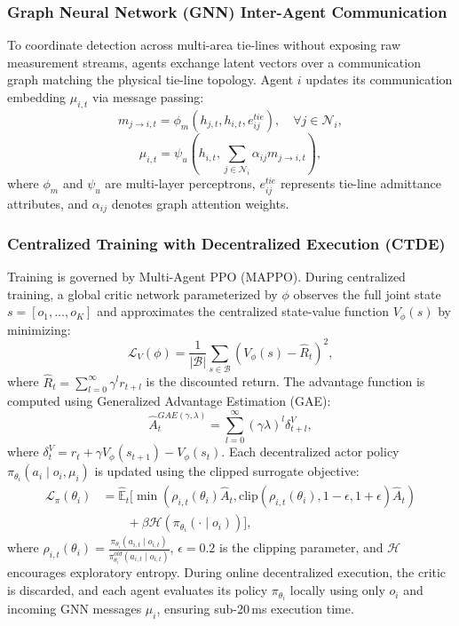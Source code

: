 \documentclass[journal,compsoc]{IEEEtran}
\begin{document}
\subsubsection{Graph Neural Network (GNN) Inter-Agent Communication}
To coordinate detection across multi-area tie-lines without exposing raw measurement streams, agents exchange latent vectors over a communication graph matching the physical tie-line topology. Agent $i$ updates its communication embedding $\mu_{i,t}$ via message passing:
\begin{equation}
    m_{j \to i, t} = \phi_m(h_{j,t}, h_{i,t}, e_{ij}^{tie}), \quad \forall j \in \mathcal{N}_i,
\end{equation}
\begin{equation}
    \mu_{i,t} = \psi_u\left( h_{i,t}, \sum_{j \in \mathcal{N}_i} \alpha_{ij} m_{j \to i, t} \right),
\end{equation}
where $\phi_m$ and $\psi_u$ are multi-layer perceptrons, $e_{ij}^{tie}$ represents tie-line admittance attributes, and $\alpha_{ij}$ denotes graph attention weights.

\subsubsection{Centralized Training with Decentralized Execution (CTDE)}
Training is governed by Multi-Agent PPO (MAPPO). During centralized training, a global critic network parameterized by $\phi$ observes the full joint state $s = [o_1, \dots, o_K]$ and approximates the centralized state-value function $V_\phi(s)$ by minimizing:
\begin{equation}
    \mathcal{L}_V(\phi) = \frac{1}{|\mathcal{B}|} \sum_{s \in \mathcal{B}} \left( V_\phi(s) - \hat{R}_t \right)^2,
\end{equation}
where $\hat{R}_t = \sum_{l=0}^\infty \gamma^l r_{t+l}$ is the discounted return. The advantage function is computed using Generalized Advantage Estimation (GAE):
\begin{equation}
    \hat{A}_t^{GAE(\gamma, \lambda)} = \sum_{l=0}^\infty (\gamma \lambda)^l \delta_{t+l}^V,
\end{equation}
where $\delta_t^V = r_t + \gamma V_\phi(s_{t+1}) - V_\phi(s_t)$. Each decentralized actor policy $\pi_{\theta_i}(a_i \mid o_i, \mu_i)$ is updated using the clipped surrogate objective:
\begin{align}
    \mathcal{L}_\pi(\theta_i) &= \hat{\mathbb{E}}_t \Bigg[ \min \left( \rho_{i,t}(\theta_i) \hat{A}_t, \text{clip}(\rho_{i,t}(\theta_i), 1-\epsilon, 1+\epsilon) \hat{A}_t \right) \nonumber \\
    &\quad\quad + \beta \mathcal{H}(\pi_{\theta_i}(\cdot \mid o_i)) \Bigg],
\end{align}
where $\rho_{i,t}(\theta_i) = \frac{\pi_{\theta_i}(a_{i,t} \mid o_{i,t})}{\pi_{\theta_i}^{old}(a_{i,t} \mid o_{i,t})}$, $\epsilon = 0.2$ is the clipping parameter, and $\mathcal{H}$ encourages exploratory entropy. During online decentralized execution, the critic is discarded, and each agent evaluates its policy $\pi_{\theta_i}$ locally using only $o_i$ and incoming GNN messages $\mu_i$, ensuring sub-20\,ms execution time.
\end{document}
